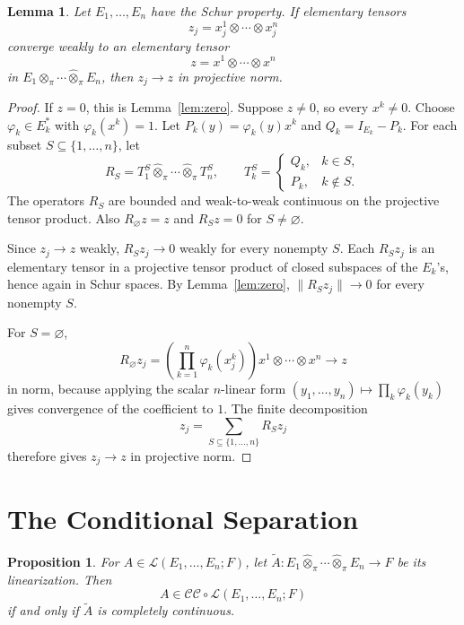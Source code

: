 \documentclass[11pt]{amsart}
\newtheorem{lemma}{Lemma}
\newtheorem{proposition}{Proposition}
\newcommand{\CC}{\mathcal{CC}}
\newcommand{\LLL}{\mathcal{L}}
\newcommand{\tensorpi}{\widehat{\otimes}_{\pi}}
\begin{document}
\begin{lemma}\label{lem:pure-schur}
Let \(E_1,\ldots,E_n\) have the Schur property. If elementary tensors
\[
  z_j=x_j^1\otimes\cdots\otimes x_j^n
\]
converge weakly to an elementary tensor
\[
  z=x^1\otimes\cdots\otimes x^n
\]
in \(E_1\tensorpi\cdots\tensorpi E_n\), then \(z_j\to z\) in projective norm.
\end{lemma}

\begin{proof}
If \(z=0\), this is Lemma~\ref{lem:zero}. Suppose \(z\neq 0\), so every
\(x^k\neq 0\). Choose \(\varphi_k\in E_k^*\) with \(\varphi_k(x^k)=1\).
Let \(P_k(y)=\varphi_k(y)x^k\) and \(Q_k=I_{E_k}-P_k\). For each subset
\(S\subseteq\{1,\ldots,n\}\), let
\[
  R_S=T_1^S\tensorpi\cdots\tensorpi T_n^S,
  \qquad
  T_k^S=
  \begin{cases}
    Q_k, & k\in S,\\
    P_k, & k\notin S.
  \end{cases}
\]
The operators \(R_S\) are bounded and weak-to-weak continuous on the
projective tensor product. Also \(R_{\varnothing}z=z\) and \(R_S z=0\) for
\(S\neq\varnothing\).

Since \(z_j\to z\) weakly, \(R_Sz_j\to 0\) weakly for every nonempty \(S\).
Each \(R_Sz_j\) is an elementary tensor in a projective tensor product of
closed subspaces of the \(E_k\)'s, hence again in Schur spaces. By
Lemma~\ref{lem:zero}, \(\|R_Sz_j\|\to 0\) for every nonempty \(S\).

For \(S=\varnothing\),
\[
  R_{\varnothing}z_j
  =
  \left(\prod_{k=1}^n \varphi_k(x_j^k)\right)
  x^1\otimes\cdots\otimes x^n
  \longrightarrow z
\]
in norm, because applying the scalar \(n\)-linear form
\((y_1,\ldots,y_n)\mapsto\prod_k\varphi_k(y_k)\) gives convergence of the
coefficient to \(1\). The finite decomposition
\[
  z_j=\sum_{S\subseteq\{1,\ldots,n\}}R_Sz_j
\]
therefore gives \(z_j\to z\) in projective norm.
\end{proof}

\section*{The Conditional Separation}

\begin{proposition}\label{prop:linearization}
For \(A\in\LLL(E_1,\ldots,E_n;F)\), let
\(\widetilde A:E_1\tensorpi\cdots\tensorpi E_n\to F\) be its linearization.
Then
\[
  A\in \CC\circ\LLL(E_1,\ldots,E_n;F)
\]
if and only if \(\widetilde A\) is completely continuous.
\end{proposition}
\end{document}
